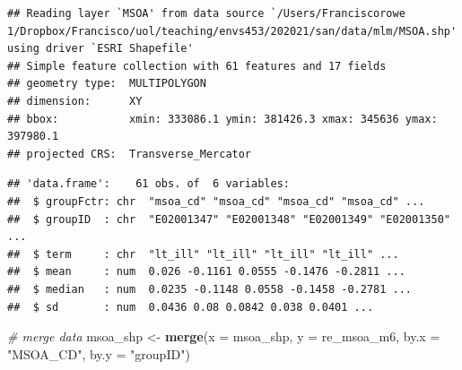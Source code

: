 \documentclass[
]{book}
\newenvironment{Shaded}{\begin{snugshade}}{\end{snugshade}}
\newcommand{\CommentTok}[1]{\textcolor[rgb]{0.56,0.35,0.01}{\textit{#1}}}
\newcommand{\DataTypeTok}[1]{\textcolor[rgb]{0.13,0.29,0.53}{#1}}
\newcommand{\KeywordTok}[1]{\textcolor[rgb]{0.13,0.29,0.53}{\textbf{#1}}}
\newcommand{\NormalTok}[1]{#1}
\newcommand{\OperatorTok}[1]{\textcolor[rgb]{0.81,0.36,0.00}{\textbf{#1}}}
\newcommand{\StringTok}[1]{\textcolor[rgb]{0.31,0.60,0.02}{#1}}
\begin{document}
\begin{verbatim}
## Reading layer `MSOA' from data source `/Users/Franciscorowe 1/Dropbox/Francisco/uol/teaching/envs453/202021/san/data/mlm/MSOA.shp' using driver `ESRI Shapefile'
## Simple feature collection with 61 features and 17 fields
## geometry type:  MULTIPOLYGON
## dimension:      XY
## bbox:           xmin: 333086.1 ymin: 381426.3 xmax: 345636 ymax: 397980.1
## projected CRS:  Transverse_Mercator
\end{verbatim}

\begin{Shaded}
\end{Shaded}

\begin{verbatim}
## 'data.frame':    61 obs. of  6 variables:
##  $ groupFctr: chr  "msoa_cd" "msoa_cd" "msoa_cd" "msoa_cd" ...
##  $ groupID  : chr  "E02001347" "E02001348" "E02001349" "E02001350" ...
##  $ term     : chr  "lt_ill" "lt_ill" "lt_ill" "lt_ill" ...
##  $ mean     : num  0.026 -0.1161 0.0555 -0.1476 -0.2811 ...
##  $ median   : num  0.0235 -0.1148 0.0558 -0.1458 -0.2781 ...
##  $ sd       : num  0.0436 0.08 0.0842 0.038 0.0401 ...
\end{verbatim}

\begin{Shaded}
\begin{Highlighting}[]
\CommentTok{# merge data}
\NormalTok{msoa_shp <-}\StringTok{ }\KeywordTok{merge}\NormalTok{(}\DataTypeTok{x =}\NormalTok{ msoa_shp, }\DataTypeTok{y =}\NormalTok{ re_msoa_m6, }\DataTypeTok{by.x =} \StringTok{"MSOA_CD"}\NormalTok{, }\DataTypeTok{by.y =} \StringTok{"groupID"}\NormalTok{)}
\end{Highlighting}
\end{Shaded}
\end{document}
